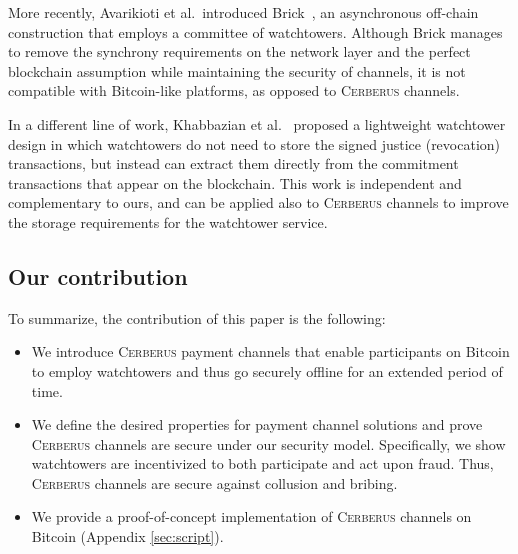 \documentclass[twocolumn,showpacs,%
  nofootinbib,aps,superscriptaddress,%
  eqsecnum,prd,notitlepage,showkeys,10pt]{revtex4-1}
\newcommand{\authnote}[3]{{ \footnotesize \bf{#1[#2: #3]~}}} %
\newcommand{\edit}[1]{\authnote{\color{blue}}{edit}{#1}}
\newcommand{\sys}{\textsc{Cerberus}\xspace}
\begin{document}
More recently, Avarikioti et al.\ introduced Brick~\cite{avarikioti2019brick}, an asynchronous off-chain construction that employs a committee of watchtowers. Although Brick manages to remove the synchrony requirements on the network layer and the perfect blockchain assumption while maintaining the security of channels, it is not compatible with Bitcoin-like platforms, as opposed to \sys channels.

In a different line of work, Khabbazian  et al.~\cite{khabbazian2019outpost} proposed a lightweight watchtower design in which watchtowers do not need to store the signed justice (revocation) transactions, but instead can extract them  directly from the commitment transactions that appear on the blockchain.
This work is independent and complementary to ours, and can be applied also to \sys channels to improve the storage requirements for the watchtower service.

\subsection{Our contribution} To summarize, the contribution of this paper is the following:
\begin{itemize}

    \item We introduce \sys payment channels that
enable participants on Bitcoin to employ watchtowers and thus go securely offline for an extended period of time.
    \item We define the desired properties for payment channel solutions and prove \sys channels are secure under our security model. Specifically, we show  watchtowers are incentivized to both participate and act upon fraud. Thus, \sys channels are secure against collusion and bribing.
    \item We provide a proof-of-concept implementation of \sys channels on Bitcoin (Appendix \ref{sec:script}).
\end{itemize}
\end{document}
